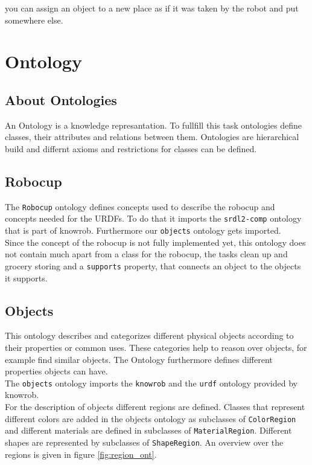 \documentclass[main.tex]{subfiles}
\begin{document}
you can assign an object to a new place as if it was taken by the robot and put somewhere else.

\section{Ontology}
\subsection{About Ontologies}
An Ontology is a knowledge represantation. To fullfill this task ontologies define classes, their attributes and relations between them. Ontologies are hierarchical build and differnt axioms and restrictions for classes can be defined.


\subsection{Robocup}
The \texttt{Robocup} ontology defines concepts used to describe the robocup and concepts needed for the URDFs. To do that it imports the \texttt{srdl2-comp} ontology that is part of knowrob. Furthermore our \texttt{objects} ontology gets imported.\\
Since the concept of the robocup is not fully implemented yet, this ontology does not contain much apart from a class for the robocup, the tasks clean up and grocery storing and a \texttt{supports} property, that connects an object to the objects it supports.

\subsection{Objects}

This ontology describes and categorizes different physical objects according to their properties or common uses. These categories help to reason over objects, for example find similar objects. The Ontology furthermore defines different properties objects can have. \\
The \texttt{objects} ontology imports the \texttt{knowrob} and the \texttt{urdf} ontology provided by knowrob.\\
For the description of objects different regions are defined. Classes that represent different colors are added in the objects ontology as subclasses of \texttt{ColorRegion} and different materials are defined in subclasses of \texttt{MaterialRegion}. Different shapes are represented by subclasses of \texttt{ShapeRegion}. An overview over the regions is given in figure \ref{fig:region_ont}.
\end{document}
